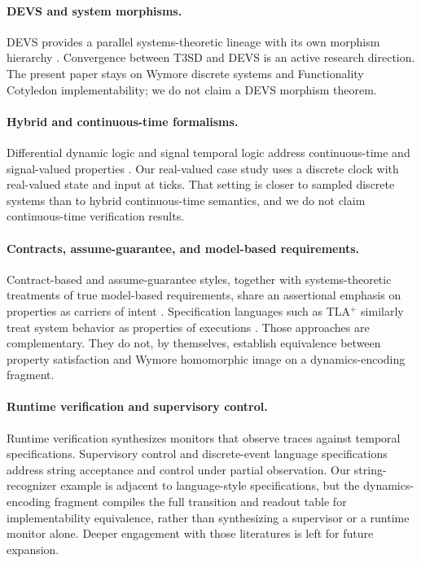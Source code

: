 \paragraph{DEVS and system morphisms.}
DEVS provides a parallel systems-theoretic lineage with its own morphism hierarchy \citep{wach2021devs}. Convergence between T3SD and DEVS is an active research direction. The present paper stays on Wymore discrete systems and Functionality Cotyledon implementability; we do not claim a DEVS morphism theorem.

\paragraph{Hybrid and continuous-time formalisms.}
Differential dynamic logic and signal temporal logic address continuous-time and signal-valued properties \citep{platzer2018logical,MalerNickovic2004}. Our real-valued case study uses a discrete clock with real-valued state and input at ticks. That setting is closer to sampled discrete systems than to hybrid continuous-time semantics, and we do not claim continuous-time verification results.

\paragraph{Contracts, assume-guarantee, and model-based requirements.}
Contract-based and assume-guarantee styles, together with systems-theoretic treatments of true model-based requirements, share an assertional emphasis on properties as carriers of intent \citep{salado2019mbse}. Specification languages such as TLA$^+$ similarly treat system behavior as properties of executions \citep{Lamport2002}. Those approaches are complementary. They do not, by themselves, establish equivalence between property satisfaction and Wymore homomorphic image on a dynamics-encoding fragment.

\paragraph{Runtime verification and supervisory control.}
Runtime verification synthesizes monitors that observe traces against temporal specifications. Supervisory control and discrete-event language specifications address string acceptance and control under partial observation. Our string-recognizer example is adjacent to language-style specifications, but the dynamics-encoding fragment compiles the full transition and readout table for implementability equivalence, rather than synthesizing a supervisor or a runtime monitor alone. Deeper engagement with those literatures is left for future expansion.
